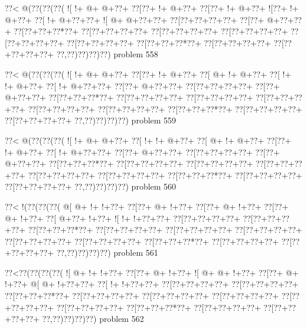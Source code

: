 \vbox{\vbox{\goo
\0??<\- @(\0??(\0??(\0??(
\- ![\- !+\- @+\- @+\0??+
\0??[\0??+\- !+\- @+\0??+
\0??[\0??+\- !+\- @+\0??+
\- ![\0??+\- !+\- @+\0??+
\0??[\- !+\- @+\0??+\0??+
\- ![\- @+\- @+\0??+\0??+
\0??[\0??+\0??+\0??+\0??+
\0??[\0??+\- @+\0??+\0??+
\0??[\0??+\0??+\0??*\0??+
\0??[\0??+\0??+\0??+\0??+
\0??[\0??+\0??+\0??+\0??+
\0??[\0??+\0??+\0??+\0??+
\0??[\0??+\0??+\0??+\0??+
\0??[\0??+\0??+\0??+\0??+
\0??[\0??+\0??+\0??*\0??+
\0??[\0??+\0??+\0??+\0??+
\0??[\0??+\0??+\0??+\0??+
\0??,\0??)\0??)\0??)\0??)
}
\hfil problem 558\hfil\break
}

\vbox{\vbox{\goo
\0??<\- @(\0??(\0??(\0??(
\- ![\- !+\- @+\- @+\0??+
\0??[\0??+\- !+\- @+\0??+
\0??[\- @+\- !+\- @+\0??+
\0??[\- !+\- !+\- @+\0??+
\0??[\- !+\- @+\0??+\0??+
\0??[\0??+\- @+\0??+\0??+
\0??[\0??+\0??+\0??+\0??+
\0??[\0??+\- @+\0??+\0??+
\0??[\0??+\0??+\0??*\0??+
\0??[\0??+\0??+\0??+\0??+
\0??[\0??+\0??+\0??+\0??+
\0??[\0??+\0??+\0??+\0??+
\0??[\0??+\0??+\0??+\0??+
\0??[\0??+\0??+\0??+\0??+
\0??[\0??+\0??+\0??*\0??+
\0??[\0??+\0??+\0??+\0??+
\0??[\0??+\0??+\0??+\0??+
\0??,\0??)\0??)\0??)\0??)
}
\hfil problem 559\hfil\break
}

\vbox{\vbox{\goo
\0??<\- @(\0??(\0??(\0??(
\- ![\- !+\- @+\- @+\0??+
\0??[\- !+\- !+\- @+\0??+
\0??[\- @+\- !+\- @+\0??+
\0??[\0??+\- !+\- @+\0??+
\0??[\- !+\- @+\0??+\0??+
\0??[\0??+\- @+\0??+\0??+
\0??[\0??+\0??+\0??+\0??+
\0??[\0??+\- @+\0??+\0??+
\0??[\0??+\0??+\0??*\0??+
\0??[\0??+\0??+\0??+\0??+
\0??[\0??+\0??+\0??+\0??+
\0??[\0??+\0??+\0??+\0??+
\0??[\0??+\0??+\0??+\0??+
\0??[\0??+\0??+\0??+\0??+
\0??[\0??+\0??+\0??*\0??+
\0??[\0??+\0??+\0??+\0??+
\0??[\0??+\0??+\0??+\0??+
\0??,\0??)\0??)\0??)\0??)
}
\hfil problem 560\hfil\break
}

\vbox{\vbox{\goo
\0??<\- !(\0??(\0??(\0??(
\- @[\- @+\- !+\- !+\0??+
\0??[\0??+\- @+\- !+\0??+
\0??[\0??+\- @+\- !+\0??+
\0??[\0??+\- @+\- !+\0??+
\0??[\- @+\0??+\- !+\0??+
\- ![\- !+\- !+\0??+\0??+
\0??[\0??+\0??+\0??+\0??+
\0??[\0??+\0??+\0??+\0??+
\0??[\0??+\0??+\0??*\0??+
\0??[\0??+\0??+\0??+\0??+
\0??[\0??+\0??+\0??+\0??+
\0??[\0??+\0??+\0??+\0??+
\0??[\0??+\0??+\0??+\0??+
\0??[\0??+\0??+\0??+\0??+
\0??[\0??+\0??+\0??*\0??+
\0??[\0??+\0??+\0??+\0??+
\0??[\0??+\0??+\0??+\0??+
\0??,\0??)\0??)\0??)\0??)
}
\hfil problem 561\hfil\break
}

\vbox{\vbox{\goo
\0??<\0??(\0??(\0??(\0??(
\- ![\- @+\- !+\- !+\0??+
\0??[\0??+\- @+\- !+\0??+
\- ![\- @+\- @+\- !+\0??+
\0??[\0??+\- @+\- !+\0??+
\- @[\- @+\- !+\0??+\0??+
\0??[\- !+\- !+\0??+\0??+
\0??[\0??+\0??+\0??+\0??+
\0??[\0??+\0??+\0??+\0??+
\0??[\0??+\0??+\0??*\0??+
\0??[\0??+\0??+\0??+\0??+
\0??[\0??+\0??+\0??+\0??+
\0??[\0??+\0??+\0??+\0??+
\0??[\0??+\0??+\0??+\0??+
\0??[\0??+\0??+\0??+\0??+
\0??[\0??+\0??+\0??*\0??+
\0??[\0??+\0??+\0??+\0??+
\0??[\0??+\0??+\0??+\0??+
\0??,\0??)\0??)\0??)\0??)
}
\hfil problem 562\hfil\break
}

